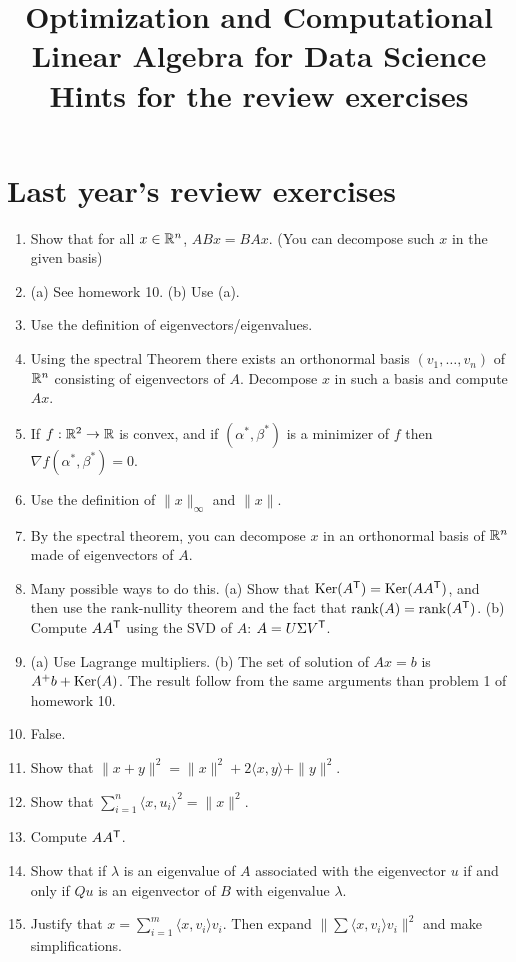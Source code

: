 \documentclass[11pt,nocut]{article}
\title{\vspace{-2.0cm}%
	Optimization and Computational Linear Algebra for Data Science\\
Hints for the review exercises}
\date{}
\begin{document}
\maketitle
%
\section{Last year's review exercises}

\begin{enumerate}
	\item Show that for all $x \in \mathbb{R}^n$, $ABx=BAx$. (You can decompose such $x$ in the given basis)
	\item (a) See homework 10. (b) Use (a).
	\item Use the definition of eigenvectors/eigenvalues.
	\item Using the spectral Theorem there exists an orthonormal basis $(v_1, \dots, v_n)$ of $\mathbb{R}^n$ consisting of eigenvectors of $A$. Decompose $x$ in such a basis and compute $Ax$.
	\item If $f: \mathbb{R}^2 \to \mathbb{R}$ is convex, and if $(\alpha^*,\beta^*)$ is a minimizer of $f$ then $\nabla f(\alpha^*,\beta^*) = 0$.
	\item Use the definition of $\|x\|_{\infty}$ and $\|x\|$.
	\item By the spectral theorem, you can decompose $x$ in an orthonormal basis of $\mathbb{R}^n$ made of eigenvectors of $A$.
	\item Many possible ways to do this. (a) Show that ${{\rm Ker}}(A^{{\sf T}}) = {{\rm Ker}}(AA^{{\sf T}})$, and then use the rank-nullity theorem and the fact that ${{\rm rank}}(A) = {{\rm rank}}(A^{{\sf T}})$. (b) Compute $AA^{{\sf T}}$ using the SVD of $A$: $A = U \Sigma V^{{\sf T}}$.
	\item (a) Use Lagrange multipliers. (b)  The set of solution of $Ax=b$ is $A^+ b + {{\rm Ker}}(A)$. The result follow from the same arguments than problem 1 of homework 10. 
	\item False.
	\item Show that $\|x+y\|^2 = \|x\|^2 + 2 \langle x,y \rangle + \|y\|^2$.
	\item Show that $\sum_{i=1}^n \langle x,u_i \rangle^2 = \|x\|^2$.
	\item Compute $AA^{{\sf T}}$.
	\item Show that if $\lambda$ is an eigenvalue of $A$ associated with the eigenvector $u$ if and only if $Qu$ is an eigenvector of $B$ with eigenvalue $\lambda$.
	\item Justify that $x = \sum_{i=1}^m \langle x,v_i\rangle v_i$. Then expand $\| \sum \langle x,v_i \rangle v_i \|^2$ and make simplifications.

\end{enumerate}
\end{document}
